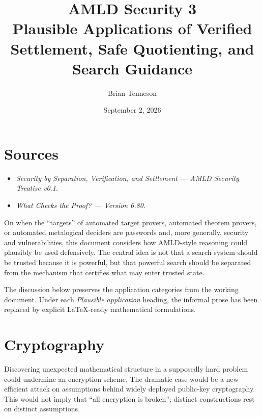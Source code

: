 \documentclass[11pt]{article}
\title{\textbf{AMLD Security 3}\\
\large Plausible Applications of Verified Settlement, Safe Quotienting, and Search Guidance}
\author{Brian Tenneson}
\date{September 2, 2026}
\begin{document}
\maketitle

\section*{Sources}
\begin{itemize}[leftmargin=*]
\item \emph{Security by Separation, Verification, and Settlement --- AMLD Security Treatise v0.1}.
\item \emph{What Checks the Proof? --- Version 6.80}.
\end{itemize}

On when the ``targets'' of automated target provers, automated theorem provers, or automated
metalogical deciders are passwords and, more generally, security and vulnerabilities, this document
considers how AMLD-style reasoning could plausibly be used defensively. The central idea is not that
a search system should be trusted because it is powerful, but that powerful search should be separated
from the mechanism that certifies what may enter trusted state.

The discussion below preserves the application categories from the working document. Under each
\emph{Plausible application} heading, the informal prose has been replaced by explicit LaTeX-ready
mathematical formulations.

\section{Cryptography}
Discovering unexpected mathematical structure in a supposedly hard problem could undermine an
encryption scheme. The dramatic case would be a new efficient attack on assumptions behind widely
deployed public-key cryptography. This would not imply that ``all encryption is broken''; distinct
constructions rest on distinct assumptions.
\end{document}
